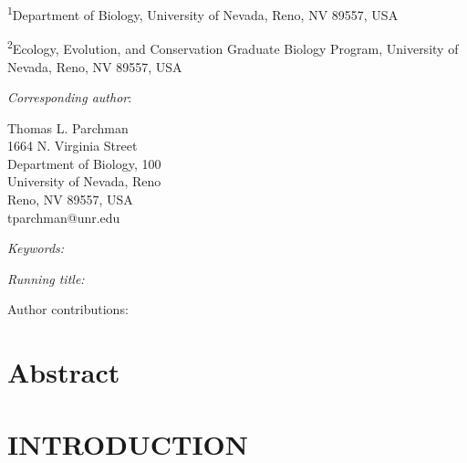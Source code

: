 \documentclass[letterpaper, 12pt]{article}
\begin{document}


\medskip


\bigskip   

\noindent \parbox[t]{6.5in}{\textsuperscript{1}Department of Biology, University of Nevada, Reno, NV 89557, USA}

\noindent \parbox[t]{6.5in}{\textsuperscript{2}Ecology, Evolution, and Conservation Graduate Biology Program, University of Nevada, Reno, NV 89557, USA}
  
\vspace{1in}

\noindent \emph{Corresponding author}: \parbox[t]{4in}{Thomas L. Parchman\\
  1664 N. Virginia Street\\
  Department of Biology, 100\\
  University of Nevada, Reno\\
  Reno, NV 89557, USA\\
  tparchman@unr.edu
}

\bigskip

\noindent \emph{Keywords:} 

\bigskip

\noindent \emph{Running title: }
\bigskip


\noindent Author contributions: 

\newpage





\section*{Abstract}
\textbf{}
\newline
\pagebreak
\newpage


\section*{INTRODUCTION}
\end{document}
